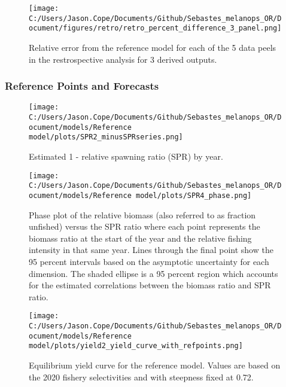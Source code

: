 \documentclass[11pt,
  english,
  letterpaper,
]{article}
\begin{document}
\begin{figure}
\centering
\texttt{[image: C:/Users/Jason.Cope/Documents/Github/Sebastes\_melanops\_OR/Document/figures/retro/retro\_percent\_difference\_3\_panel.png]}
\caption{Relative error from the reference model for each of the 5 data peels in the restrospective analysis for 3 derived outputs.\label{fig:retro-RE_comps}}
\end{figure}

\newpage

\hypertarget{reference-points-and-forecasts}{%
\subsubsection{Reference Points and Forecasts}\label{reference-points-and-forecasts}}

\begin{figure}
\centering
\texttt{[image: C:/Users/Jason.Cope/Documents/Github/Sebastes\_melanops\_OR/Document/models/Reference model/plots/SPR2\_minusSPRseries.png]}
\caption{Estimated 1 - relative spawning ratio (SPR) by year.\label{fig:1-spr}}
\end{figure}

\clearpage

\begin{figure}
\centering
\texttt{[image: C:/Users/Jason.Cope/Documents/Github/Sebastes\_melanops\_OR/Document/models/Reference model/plots/SPR4\_phase.png]}
\caption{Phase plot of the relative biomass (also referred to as fraction unfished) versus the SPR ratio where each point represents the biomass ratio at the start of the year and the relative fishing intensity in that same year. Lines through the final point show the 95 percent intervals based on the asymptotic uncertainty for each dimension. The shaded ellipse is a 95 percent region which accounts for the estimated correlations between the biomass ratio and SPR ratio.\label{fig:phase}}
\end{figure}

\newpage

\begin{figure}
\centering
\texttt{[image: C:/Users/Jason.Cope/Documents/Github/Sebastes\_melanops\_OR/Document/models/Reference model/plots/yield2\_yield\_curve\_with\_refpoints.png]}
\caption{Equilibrium yield curve for the reference model. Values are based on the 2020 fishery selectivities and with steepness fixed at 0.72.\label{fig:yield}}
\end{figure}
\end{document}
